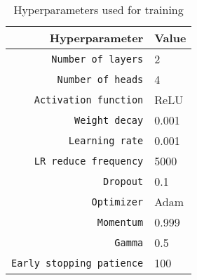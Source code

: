 \begin{table}
    \centering
    \caption{Hyperparameters used for training}
    \label{tab:hyperparams}
    \begin{tabular}{rl}
        \toprule
        \textbf{Hyperparameter} & \textbf{Value} \\
        \midrule
        \texttt{Number of layers} & 2 \\
        \texttt{Number of heads} &  4 \\
        \texttt{Activation function} & ReLU \\
        \texttt{Weight decay} & 0.001 \\
        \texttt{Learning rate} & 0.001 \\
        \texttt{LR reduce frequency} & 5000 \\
        \texttt{Dropout} & 0.1 \\
        \texttt{Optimizer} & Adam \\
        \texttt{Momentum} & 0.999 \\
        \texttt{Gamma} & 0.5 \\        
        \texttt{Early stopping patience} & 100 \\
        \bottomrule
    \end{tabular}
\end{table}
